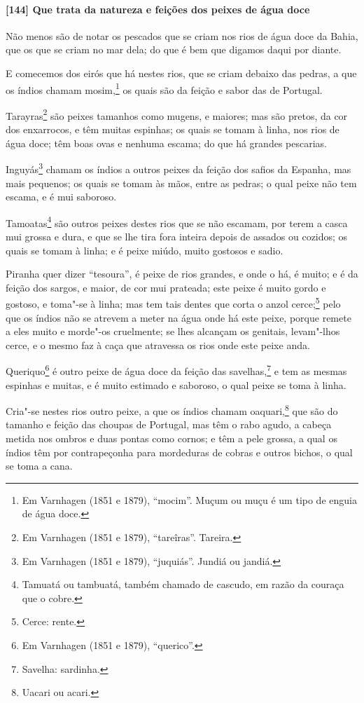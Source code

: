 \paragraph{[144] Que trata da natureza e feições dos peixes de água doce}\quad
Não menos são de notar os pescados que se criam nos rios de água doce da Bahia, que os que
se criam no mar dela; do que é bem que digamos daqui por diante.

E comecemos dos eirós que há nestes rios, que se criam debaixo das pedras, a que os índios
chamam mosim,\footnote{ Em Varnhagen (1851 e 1879), ``mocim''. Muçum ou muçu é um tipo de
enguia de água doce.} os quais são da feição e sabor das de Portugal.

Tarayras\footnote{ Em Varnhagen (1851 e 1879), ``tareîras''. Tareira.} são peixes tamanhos
como mugens, e maiores; mas são pretos, da cor dos enxarrocos, e têm muitas espinhas; os
quais se tomam à linha, nos rios de água doce; têm boas ovas e nenhuma escama; do que há
grandes pescarias.

Inguyás\footnote{ Em Varnhagen (1851 e 1879), ``juquiás''. Jundiá ou jandiá.} chamam os
índios a outros peixes da feição dos safios da Espanha, mas mais pequenos; os quais se
tomam às mãos, entre as pedras; o qual peixe não tem escama, e é mui saboroso.

Tamoatas\footnote{ Tamuatá ou tambuatá, também chamado de cascudo, em razão da couraça que
o cobre.} são outros peixes destes rios que se não escamam, por terem a casca mui grossa e
dura, e que se lhe tira fora inteira depois de assados ou cozidos; os quais se tomam à
linha; e é peixe miúdo, muito gostosos e sadio.

Piranha quer dizer ``tesoura'', é peixe de rios grandes, e onde o há, é muito; e é da
feição dos sargos, e maior, de cor mui prateada; este peixe é muito gordo e gostoso, e
toma"-se à linha; mas tem tais dentes que corta o anzol cerce;\footnote{ Cerce: rente.}
pelo que os índios não se atrevem a meter na água onde há este peixe, porque remete a eles
muito e morde"-os cruelmente; se lhes alcançam os genitais, levam"-lhos cerce, e o mesmo faz
à caça que atravessa os rios onde este peixe anda.

Queriquo\footnote{ Em Varnhagen (1851 e 1879), ``querico''.} é outro peixe de água doce da
feição das savelhas,\footnote{ Savelha: sardinha.} e tem as mesmas espinhas e muitas, e é
muito estimado e saboroso, o qual peixe se toma à linha.

Cria"-se nestes rios outro peixe, a que os índios chamam oaquari,\footnote{ Uacari ou
acari.} que são do tamanho e feição das choupas de Portugal, mas têm o rabo agudo, a
cabeça metida nos ombros e duas pontas como cornos; e têm a pele grossa, a qual os índios
têm por contrapeçonha para mordeduras de cobras e outros bichos, o qual se toma a cana.

